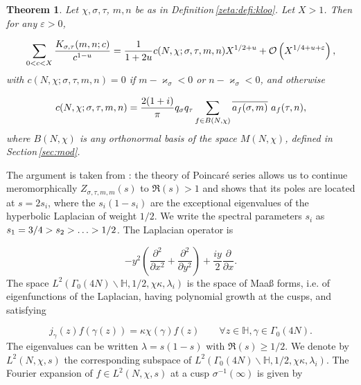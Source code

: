 \documentclass[leqno,10pt]{amsart}
\theoremstyle{plain}
\numberwithin{equation}{section}
\newtheorem{thm}{Theorem}[section]
\theoremstyle{definition}
\theoremstyle{remark}
\begin{document}
\begin{thm}\label{zeta:thm}
Let $\chi, \sigma,\tau$, $m,n$ be as in Definition\,\ref{zeta:defi:kloo}. Let $X>1$. Then for any $\varepsilon>0$,

\begin{equation*}
\sum_{0<c < X} \frac{K_{\sigma,\tau}(m,n;c)}{c^{1-u}} =  \frac{1}{1+2u} c(N,\chi;\sigma,\tau,m,n) X^{1/2+u} +  \mathcal{O}\left( X^{1/4+u+\varepsilon}\right),
\end{equation*}
with $c(N,\chi;\sigma,\tau,m,n)=0$ if $m-\varkappa_\sigma<0$ or $n-\varkappa_\sigma<0$, and 
otherwise

\begin{equation*}
c(N,\chi;\sigma,\tau,m,n)= \frac{2(1+i)}{\pi} q_\sigma q_\tau \sum_{f\in B(N,\chi)} \overline{a_f(\sigma,m)} \ a_f(\tau,n),
\end{equation*}
where $B(N,\chi)$ is any orthonormal basis of the space $M(N,\chi)$, defined in Section\,\ref{sec:mod}.
\end{thm}

\proof
The argument is taken from \cite{gol-sar:kloo}: the theory of Poincar\'e series allows us to continue meromorphically $Z_{\sigma,\tau,m,m}(s)$ to $\Re(s) >1$ and shows that its poles are located at $s=2s_i$, where the $s_i(1-s_i)$ are the exceptional eigenvalues of the hyperbolic Laplacian of weight $1/2$.  We write the spectral parameters $s_i$ as $s_1=3/4 > s_2 > \ldots > 1/2$. The Laplacian operator is

\begin{equation*}
-y^2 \left(\frac{\partial^2}{\partial x^2}+\frac{\partial^2}{\partial y^2}\right) +\frac{iy}{2} \frac{\partial }{\partial x}.
\end{equation*}
The space $L^2\left(\Gamma_0(4N)\backslash \mathbb{H}, 1/2, \chi\kappa, \lambda_i\right)$ is the space of Maa\ss{} forms, i.e. of eigenfunctions of the Laplacian, having polynomial growth at the cusps, and satisfying 

\begin{equation*}
j_\gamma(z) f\left(\gamma(z)\right) =\kappa \chi (\gamma) f(z) \qquad \forall z\in \mathbb{H}, \gamma \in \Gamma_0(4N).
\end{equation*}
The eigenvalues can be written $\lambda=s(1-s)$ with $\Re(s)\geqslant 1/2$. We denote by $L^2(N,\chi,s)$ the corresponding subspace of $L^2\left(\Gamma_0(4N)\backslash \mathbb{H}, 1/2, \chi\kappa, \lambda_i\right)$.
The Fourier expansion of $f\in L^2(N,\chi,s)$ at a cusp $\sigma^{-1}(\infty)$ is given by 
\end{document}
